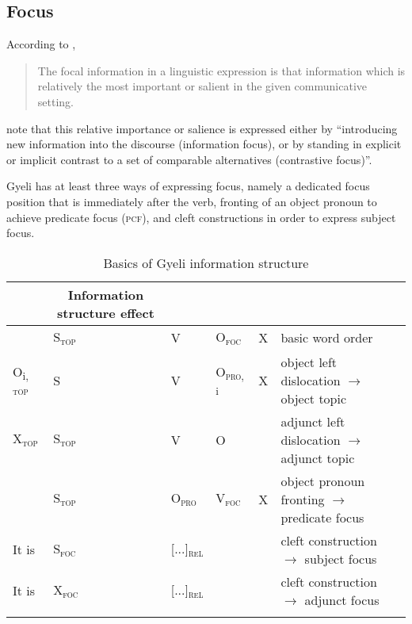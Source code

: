 \subsection*{Focus}
According to \citet[326]{dik97},
\begin{quote}
The focal information in a linguistic expression is that information which is relatively the most important or salient in the given communicative setting.
\end{quote}

\noindent \citet[236]{fiedler2010} note that this relative importance or salience is expressed either by
 ``introducing new information into the discourse (information focus), or by standing in explicit or implicit contrast to a set of comparable alternatives (contrastive focus)''.  

\largerpage[1]
Gyeli has at least three ways of expressing focus, namely a dedicated focus position that is immediately after the verb, fronting of an object pronoun to achieve predicate focus (\textsc{pcf}), and cleft constructions in order to express subject focus.\nopagebreak
\begin{table}[b]
\small
\begin{tabularx}{\textwidth}{p{.8cm}@{~~~}p{.8cm}@{~~~}p{.8cm}@{~~~}p{.8cm}X l@{}}
 \lsptoprule
\multicolumn{5}{c}{Word order} & \multicolumn{1}{c}{Information structure effect} \\
 \midrule
 & S\textsubscript{{\textsc{top}}} & V & O\textsubscript{{\textsc{foc}}} & X & basic word order\\
 O\textsubscript{i, {\textsc{top}}} & S & V & O\textsubscript{{\textsc{pro}}, i} & X & object left dislocation $\rightarrow$ object topic\\
X\textsubscript{{\textsc{top}}} & S\textsubscript{{\textsc{top}}} &  V & O &  & adjunct left dislocation $\rightarrow$ adjunct topic\\
 & S\textsubscript{{\textsc{top}}} & O\textsubscript{{\textsc{pro}}} & V\textsubscript{{\textsc{foc}}} & X & object pronoun fronting $\rightarrow$ predicate focus\\

It is & S\textsubscript{{\textsc{foc}}} & [...]\textsubscript{{\textsc{rel}}} & & & cleft construction $\rightarrow$ subject focus\\
It is & X\textsubscript{{\textsc{foc}}} & [...]\textsubscript{{\textsc{rel}}} & & & cleft construction $\rightarrow$ adjunct focus\\
 \lspbottomrule
\end{tabularx}
\caption{Basics of Gyeli information structure}
\label{Tab:IS}
\end{table}\par\nopagebreak
